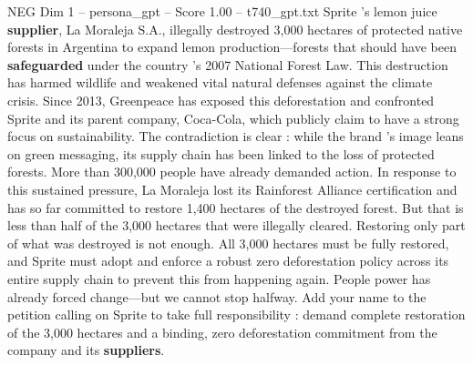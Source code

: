 \begin{textsample}{NEG Dim 1 – persona\_gpt – Score 1.00 – t740\_gpt.txt}  \label{ex:f1_neg_040}
Sprite ’s lemon juice \textbf{supplier}, La Moraleja S.A., illegally destroyed 3,000 hectares of protected native forests in Argentina to expand lemon production—forests that should have been \textbf{safeguarded} under the country ’s 2007 National Forest Law.
This destruction has harmed wildlife and weakened vital natural defenses against the climate crisis.
Since 2013, Greenpeace has exposed this deforestation and confronted Sprite and its parent company, Coca-Cola, which publicly claim to have a strong focus on sustainability.
The contradiction is clear : while the brand ’s image leans on green messaging, its supply chain has been linked to the loss of protected forests.
More than 300,000 people have already demanded action.
In response to this sustained pressure, La Moraleja lost its Rainforest Alliance certification and has so far committed to restore 1,400 hectares of the destroyed forest.
But that is less than half of the 3,000 hectares that were illegally cleared.
Restoring only part of what was destroyed is not enough.
All 3,000 hectares must be fully restored, and Sprite must adopt and enforce a robust zero deforestation policy across its entire supply chain to prevent this from happening again.
People power has already forced change—but we cannot stop halfway.
Add your name to the petition calling on Sprite to take full responsibility : demand complete restoration of the 3,000 hectares and a binding, zero deforestation commitment from the company and its \textbf{suppliers}.

\end{textsample}
